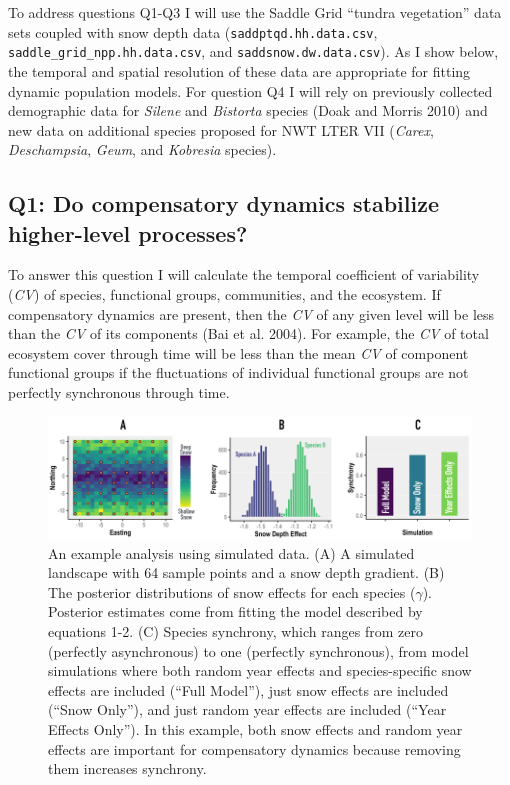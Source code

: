 \documentclass[12pt,]{article}
\begin{document}
To address questions Q1-Q3 I will use the Saddle Grid ``tundra
vegetation'' data sets coupled with snow depth data
(\texttt{saddptqd.hh.data.csv}, \texttt{saddle\_grid\_npp.hh.data.csv},
and \texttt{saddsnow.dw.data.csv}). As I show below, the temporal and
spatial resolution of these data are appropriate for fitting dynamic
population models. For question Q4 I will rely on previously collected
demographic data for \emph{Silene} and \emph{Bistorta} species (Doak and
Morris 2010) and new data on additional species proposed for NWT LTER
VII (\emph{Carex}, \emph{Deschampsia}, \emph{Geum}, and \emph{Kobresia}
species).

\subsection{Q1: Do compensatory dynamics stabilize higher-level processes?}

To answer this question I will calculate the temporal coefficient of
variability (\emph{CV}) of species, functional groups, communities, and
the ecosystem. If compensatory dynamics are present, then the \emph{CV}
of any given level will be less than the \emph{CV} of its components
(Bai et al. 2004). For example, the \emph{CV} of total ecosystem cover
through time will be less than the mean \emph{CV} of component
functional groups if the fluctuations of individual functional groups
are not perfectly synchronous through time.

\begin{figure}
  \centering
     \includegraphics[width=6.5in]{./figures/figure1.png}
  \caption{An example analysis using simulated data. (A) A simulated landscape with 64 sample points and a snow depth gradient. (B) The posterior distributions of snow effects for each species ($\gamma$). Posterior estimates come from fitting the model described by equations 1-2. (C) Species synchrony, which ranges from zero (perfectly asynchronous) to one (perfectly synchronous), from model simulations where both random year effects and species-specific snow effects are included (``Full Model''), just snow effects are included (``Snow Only''), and just random year effects are included (``Year Effects Only''). In this example, both snow effects and random year effects are important for compensatory dynamics because removing them increases synchrony.}
\end{figure}
\end{document}
